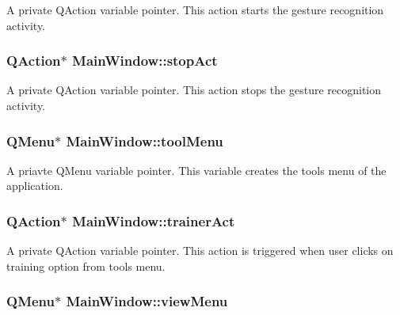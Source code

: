 \label{classMainWindow_a88a89355c71689ae45113472ffe084ee}
A private QAction variable pointer. This action starts the gesture recognition activity. \hypertarget{classMainWindow_a09f007c020624ddc5d390df40803467b}{
\subsubsection[{stopAct}]{\setlength{\rightskip}{0pt plus 5cm}QAction$\ast$ {\bf MainWindow::stopAct}}}
\label{classMainWindow_a09f007c020624ddc5d390df40803467b}
A private QAction variable pointer. This action stops the gesture recognition activity. \hypertarget{classMainWindow_a4afb06b5d9499439b9fd9d3814b0a356}{
\subsubsection[{toolMenu}]{\setlength{\rightskip}{0pt plus 5cm}QMenu$\ast$ {\bf MainWindow::toolMenu}}}
\label{classMainWindow_a4afb06b5d9499439b9fd9d3814b0a356}
A priavte QMenu variable pointer. This variable creates the tools menu of the application. \hypertarget{classMainWindow_ae400629a8446466a559ad26c70ac335d}{
\subsubsection[{trainerAct}]{\setlength{\rightskip}{0pt plus 5cm}QAction$\ast$ {\bf MainWindow::trainerAct}}}
\label{classMainWindow_ae400629a8446466a559ad26c70ac335d}
A private QAction variable pointer. This action is triggered when user clicks on training option from tools menu. \hypertarget{classMainWindow_a6e38d7c63a3dc537d05eafe7e0f5f4db}{
\subsubsection[{viewMenu}]{\setlength{\rightskip}{0pt plus 5cm}QMenu$\ast$ {\bf MainWindow::viewMenu}}}
